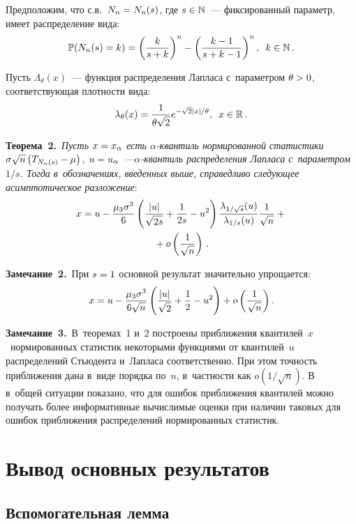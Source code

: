 \begin{multicols}{2}
Предположим, что с.в.\ $N_n \hm= N_n(s)$, где $s\hm\in\mathbb{N}$~--- 
фиксированный параметр, имеет распределение вида:
$$
\mathbb{P}(N_n(s)=k)=\left(\displaystyle\frac{\displaystyle k\mathstrut}{\displaystyle s+k\mathstrut}\right)^{n} - 
\left(\displaystyle\frac{\displaystyle k-1\mathstrut}{\displaystyle s+k-1\mathstrut}\right)^{n},\enskip k \in \mathbb{N}\,.
$$

Пусть  $\Lambda_{\theta}(x)$~--- функция распределения Лапласа 
с~параметром $\theta\hm>0$, соответствующая плотности вида:
$$ 
\lambda_{\theta}(x)=\displaystyle\frac{\displaystyle 1\mathstrut}{\displaystyle \theta\sqrt{2}\mathstrut}e^{-{\sqrt{2}|x|}/{\theta}},\enskip 
x\in \mathbb{R}\,. 
$$


\noindent
\textbf{Теорема~2.}\ 
\textit{Пусть $x\hm=x_\alpha$ есть $\alpha$-кван\-тиль 
нормированной статистики $\sigma\sqrt{n}\left(T_{N_{n}(s)}\hm-\mu  \right)$, 
$u\hm=u_\alpha$~---\linebreak $\alpha$-кван\-тиль распределения Лапласа с~па\-ра\-мет\-ром~$1/s$.
Тогда в~обозначениях, введенных выше, справедливо следующее асимптотическое 
разложение}:
\begin{multline*}
 x=u-\displaystyle\frac{\displaystyle \mu_{3}\sigma^{3}\mathstrut}{\displaystyle 6\mathstrut}\left(\displaystyle\frac{\displaystyle |u|\mathstrut}{\displaystyle \sqrt{2s}\mathstrut} +\displaystyle\frac{\displaystyle 1\mathstrut}{\displaystyle 2s\mathstrut}-u^{2}\right)
 \displaystyle\frac{\displaystyle \lambda_{1/\sqrt{s}}(u)\mathstrut}{\displaystyle \lambda_{1/s}(u)\mathstrut} \displaystyle\frac{\displaystyle 1\mathstrut}{\displaystyle \sqrt{n}\mathstrut} +{}\\
 {}+
 o\left(\displaystyle\frac{\displaystyle 1\mathstrut}{\displaystyle \sqrt{n}\mathstrut}\right)\,.
 \end{multline*}

\noindent
\textbf{Замечание~2.}\
При $s\hm=1$ основной результат значительно упрощается:
$$x = u-\displaystyle\frac{\displaystyle \mu_{3}\sigma^{3}\mathstrut}{\displaystyle 6\sqrt{n}\mathstrut}\left(
\displaystyle\frac{\displaystyle |u|\mathstrut}{\displaystyle \sqrt{2}\mathstrut} +\frac{1}{2}-u^{2}\right)  + o\left(\displaystyle\frac{\displaystyle 1\mathstrut}{\displaystyle \sqrt{n}\mathstrut}\right).
$$

\noindent
\textbf{Замечание~3.}\
В~теоремах~1 и~2 построены приближения квантилей~$x$~нормированных 
статистик некоторыми функциями от квантилей~$u$ распределений 
Стьюдента и~Лапласа соответственно. При этом точность приближения  дана 
в~виде порядка по~$n$, в~частности как $o(1/\sqrt{n}).$ 
В~\cite{Arx2016} в~общей ситуации показано, что для ошибок приближения квантилей 
можно получать более информативные вы\-чис\-ли\-мые оценки при наличии таковых для 
ошибок приближения распределений  нормированных статистик.

\section{Вывод основных результатов}

\subsection{Вспомогательная лемма}


\end{multicols}
